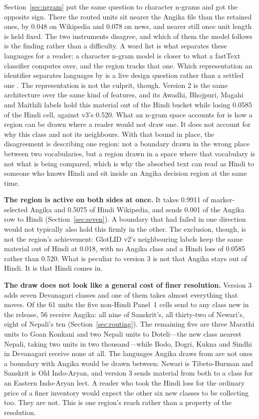 \documentclass[final]{clv2025}
\begin{document}
Section~\ref{sec:ngram} put the same question to character n-grams and got the opposite sign. There the routed units sit nearer the Angika file than the retained ones, by 0.048 on Wikipedia and 0.078 on news, and nearer still once unit length is held fixed. The two instruments disagree, and which of them the model follows is the finding rather than a difficulty. A word list is what separates these languages for a reader; a character n-gram model is closer to what a fastText classifier computes over, and the region tracks that one. Which representation an identifier separates languages by is a live design question rather than a settled one \citep{meister-etal-2026-language}. The representation is not the culprit, though. Version 2 is the same architecture over the same kind of features, and its Awadhi, Bhojpuri, Magahi and Maithili labels hold this material out of the Hindi bucket while losing 0.0585 of the Hindi cell, against v3's 0.520. What an n-gram space accounts for is how a region can be drawn where a reader would not draw one. It does not account for why this class and not its neighbours. With that bound in place, the disagreement is describing one region: not a boundary drawn in the wrong place between two vocabularies, but a region drawn in a space where that vocabulary is not what is being compared, which is why the absorbed text can read as Hindi to someone who knows Hindi and sit inside an Angika decision region at the same time.

\textbf{The region is active on both sides at once.} It takes 0.9911 of marker-selected Angika and 0.5075 of Hindi Wikipedia, and sends 0.001 of the Angika row to Hindi (Section~\ref{sec:seven}). A boundary that had failed in one direction would not typically also hold this firmly in the other. The exclusion, though, is not the region's achievement: GlotLID v2's neighbouring labels keep the same material out of Hindi at 0.018, with no Angika class and a Hindi loss of 0.0585 rather than 0.520. What is peculiar to version 3 is not that Angika stays out of Hindi. It is that Hindi comes in.

\textbf{The draw does not look like a general cost of finer resolution.} Version 3 adds seven Devanagari classes and one of them takes almost everything that moves. Of the 61 units the five non-Hindi Panel~1 cells send to any class new in the release, 56 receive Angika: all nine of Sanskrit's, all thirty-two of Newari's, eight of Nepali's ten (Section~\ref{sec:routing}). The remaining five are three Marathi units to Goan Konkani and two Nepali units to Doteli---the new class nearest Nepali, taking two units in two thousand---while Bodo, Dogri, Kukna and Sindhi in Devanagari receive none at all. The languages Angika draws from are not ones a boundary with Angika would be drawn between: Newari is Tibeto-Burman and Sanskrit is Old Indo-Aryan, and version 3 sends material from both to a class for an Eastern Indo-Aryan lect. A reader who took the Hindi loss for the ordinary price of a finer inventory would expect the other six new classes to be collecting too. They are not. This is one region's reach rather than a property of the resolution.
\end{document}
